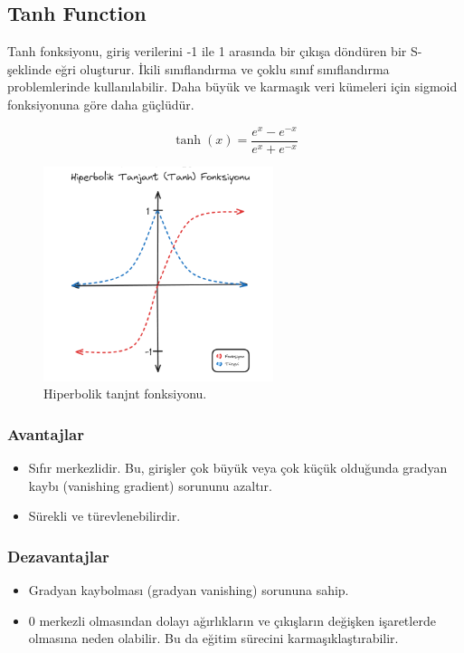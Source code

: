 \newpage

\subsection{Tanh Function}
Tanh fonksiyonu, giriş verilerini -1 ile 1 arasında bir çıkışa döndüren bir S-şeklinde eğri oluşturur. İkili sınıflandırma ve çoklu sınıf sınıflandırma problemlerinde kullanılabilir. Daha büyük ve karmaşık veri kümeleri için sigmoid fonksiyonuna göre daha güçlüdür.

\[\tanh(x) = \frac{e^{x} - e^{-x}}{e^{x} + e^{-x}}\]

\begin{figure}[h]
    \centering
    \includegraphics[width=0.6\textwidth]{images/tanh_function.png}
    \caption{Hiperbolik tanjnt fonksiyonu.}
    \label{fig:enter-label}
\end{figure}

\subsubsection{Avantajlar}
\begin{itemize}
    \item Sıfır merkezlidir. Bu, girişler çok büyük veya çok küçük olduğunda gradyan kaybı (vanishing gradient) sorununu azaltır.
    \item Sürekli ve türevlenebilirdir.
\end{itemize}

\subsubsection{Dezavantajlar}
\begin{itemize}
    \item Gradyan kaybolması (gradyan vanishing) sorununa sahip.
    \item 0 merkezli olmasından dolayı ağırlıkların ve çıkışların değişken işaretlerde olmasına neden olabilir. Bu da eğitim sürecini karmaşıklaştırabilir.
\end{itemize}

